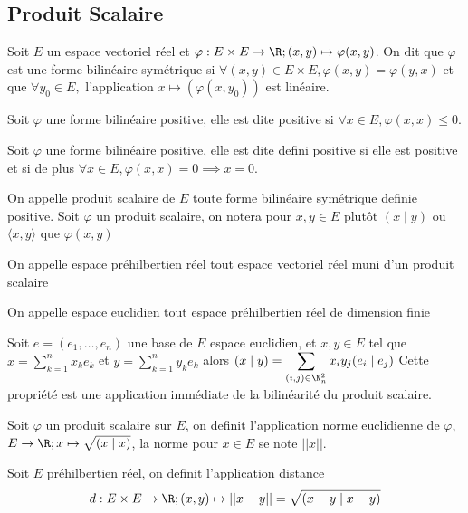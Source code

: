 \subsection{Produit Scalaire}
\begin{defini}
    Soit $E$ un espace vectoriel réel  et $\varphi : E\times E \to \R; (x,y)\mapsto \varphi(x,y)$. On dit que $\varphi$ est une forme bilinéaire symétrique si $\forall (x,y)\in E\times E, \varphi(x,y)=\varphi(y,x)$ et que $\forall y_0\in E,$ l'application $x \mapsto (\varphi(x,y_0))$ est linéaire.
\end{defini}
\begin{defini}
    Soit $\varphi$ une forme bilinéaire positive, elle est dite positive si $\forall x\in E, \varphi(x,x)\leq 0$.
\end{defini}
\begin{defini}
    Soit $\varphi$ une forme bilinéaire positive, elle est dite defini positive si elle est positive et si  de plus $\forall x\in E, \varphi(x,x)=0\implies x=0$.
\end{defini}
\begin{defini}
    On appelle produit scalaire de $E$ toute forme bilinéaire symétrique definie positive.
    Soit $\varphi$ un produit scalaire, on notera pour $x,y\in E$ plutôt $(x\mid y)$ ou $ \langle x,y\rangle $ que $\varphi(x,y)$
\end{defini}
\begin{defini}
    On appelle espace préhilbertien réel tout espace vectoriel réel muni d'un produit scalaire
\end{defini}
\begin{defini}
    On appelle espace euclidien tout espace préhilbertien réel de dimension finie
\end{defini}
\begin{prop}
    Soit $e=(e_1,\dots,e_n)$ une base de $E$ espace euclidien, et $x,y\in E$ tel que $\displaystyle x=\sum_{k=1}^n x_k e_k$ et $\displaystyle y=\sum_{k=1}^n y_k e_k$ alors $\displaystyle(x\mid y)=\sum_{(i,j)\in \N_n^2}x_iy_j(e_i\mid e_j)$
    \tcblower
    Cette propriété est une application immédiate de la bilinéarité du produit scalaire.
\end{prop}
\begin{defini}
    Soit $\varphi$ un produit scalaire sur $E$, on definit l'application norme euclidienne de $\varphi$, $E\to\R; x\mapsto \sqrt{(x\mid x)}$, la norme pour $x\in E$ se note $||x||$.
\end{defini}
\begin{defini}
    Soit $E$ préhilbertien réel, on definit l'application distance $$d: E \times E \to \R; (x,y)\mapsto ||x-y||=\sqrt{(x-y\mid x-y)}$$
\end{defini}
